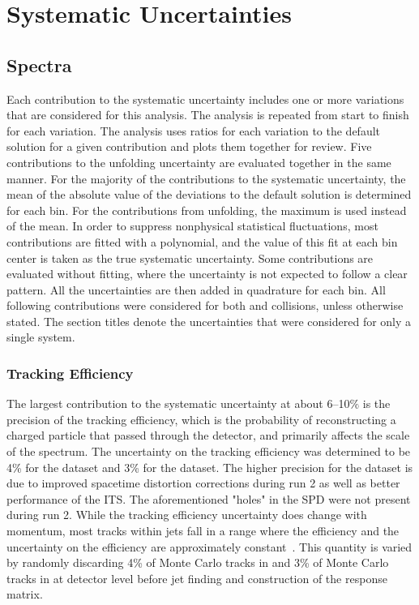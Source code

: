 \section{Systematic Uncertainties}
\label{ch:Systematics}

\subsection{Spectra}
\label{sec:SystematicsSpectra}

Each contribution to the systematic uncertainty includes one or more variations that are considered for this analysis. The analysis is repeated from start to finish for each variation. The analysis uses ratios for each variation to the default solution for a given contribution and plots them together for review. Five contributions to the unfolding uncertainty are evaluated together in the same manner. For the majority of the contributions to the systematic uncertainty, the mean of the absolute value of the deviations to the default solution is determined for each \pT bin. For the contributions from unfolding, the maximum is used instead of the mean. In order to suppress nonphysical statistical fluctuations, most contributions are fitted with a polynomial, and the value of this fit at each bin center is taken as the true systematic uncertainty. Some contributions are evaluated without fitting, where the uncertainty is not expected to follow a clear pattern. All the uncertainties are then added in quadrature for each bin. All following contributions were considered for both \pp and \pPb collisions, unless otherwise stated. The section titles denote the uncertainties that were considered for only a single system.

\subsubsection{Tracking Efficiency}

The largest contribution to the systematic uncertainty at about 6--10$\%$ is the precision of the tracking efficiency, which is the probability of reconstructing a charged particle that passed through the detector, and primarily affects the scale of the spectrum. The uncertainty on the tracking efficiency was determined to be 4\% for the \pp dataset and 3\% for the \pPb dataset. The higher precision for the \pPb dataset is due to improved spacetime distortion corrections during run 2 as well as better performance of the ITS. The aforementioned "holes" in the SPD were not present during run 2. While the tracking efficiency uncertainty does change with momentum, most tracks within jets fall in a \pT range where the efficiency and the uncertainty on the efficiency are approximately constant~\cite{ALICE:2014sbx}. This quantity is varied by randomly discarding 4\% of Monte Carlo tracks in \pp and 3\% of Monte Carlo tracks in \pPb at detector level before jet finding and construction of the response matrix.

